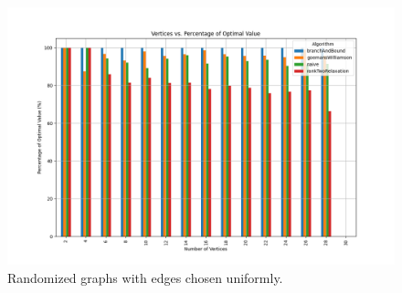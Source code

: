 \begin{figure}[H]
\centering
\includegraphics[width=\textwidth]{chapters/benchmark/Sections/images/cut/small_graphs/vertices_vs_percentage_optimal.png}
\caption{ Randomized graphs with edges chosen uniformly.}
\end{figure}




